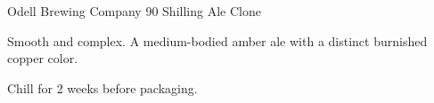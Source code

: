 \documentclass[parskip=half,fontsize=9pt,oneside]{scrbook}
\begin{document}
\mainmatter


\begin{recipe}{Odell Brewing Company 90 Shilling Ale Clone}

\begin{aboutblock}
Smooth and complex. A medium-bodied amber ale with a distinct burnished copper
color. \sourceaha
\end{aboutblock}


\begin{methodandtiming}

\begin{mashsteps}
\end{mashsteps}

\begin{fermentationsteps}
\end{fermentationsteps}

\begin{directions}
Chill for 2 weeks before packaging.
\end{directions}

\end{methodandtiming}

\recipebreak

\begin{ingredientsblock}

\begin{malts}
\end{malts}

\begin{hops}
\end{hops}


\end{ingredientsblock}

\end{recipe}


\end{document}
